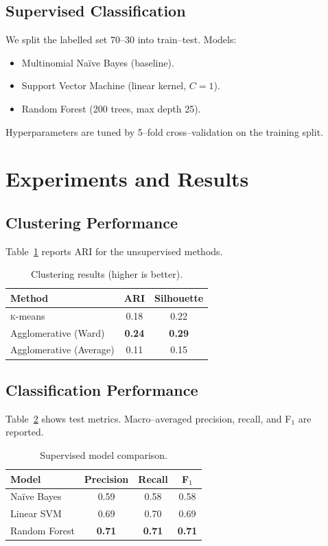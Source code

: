 \documentclass[12pt]{article}
\begin{document}
\subsection{Supervised Classification}
We split the labelled set 70--30 into train--test. 
Models:

\begin{itemize}
    \item Multinomial Na\"ive Bayes (baseline).
    \item Support Vector Machine (linear kernel, $C=1$).
    \item Random Forest (200 trees, max depth 25).
\end{itemize}

Hyperparameters are tuned by 5--fold cross--validation on the training split.

\section{Experiments and Results}
\label{sec:experiments}
\subsection{Clustering Performance}
Table~\ref{tab:cluster} reports ARI for the unsupervised methods.

\begin{table}[H]
\centering
\caption{Clustering results (higher is better).}
\begin{tabular}{lcc}
\hline
\textbf{Method} & \textbf{ARI} & \textbf{Silhouette} \\
\hline
\textsc{k}-means & 0.18 & 0.22 \\
Agglomerative (Ward) & \textbf{0.24} & \textbf{0.29} \\
Agglomerative (Average) & 0.11 & 0.15 \\
\hline
\end{tabular}
\label{tab:cluster}
\end{table}

\subsection{Classification Performance}
Table~\ref{tab:class} shows test metrics. Macro--averaged precision, recall, and F$_1$ are reported.

\begin{table}[H]
\centering
\caption{Supervised model comparison.}
\begin{tabular}{lccc}
\hline
\textbf{Model} & \textbf{Precision} & \textbf{Recall} & \textbf{F$_1$} \\
\hline
Na\"ive Bayes & 0.59 & 0.58 & 0.58 \\
Linear SVM & 0.69 & 0.70 & 0.69 \\
Random Forest & \textbf{0.71} & \textbf{0.71} & \textbf{0.71} \\
\hline
\end{tabular}
\label{tab:class}
\end{table}
\end{document}

